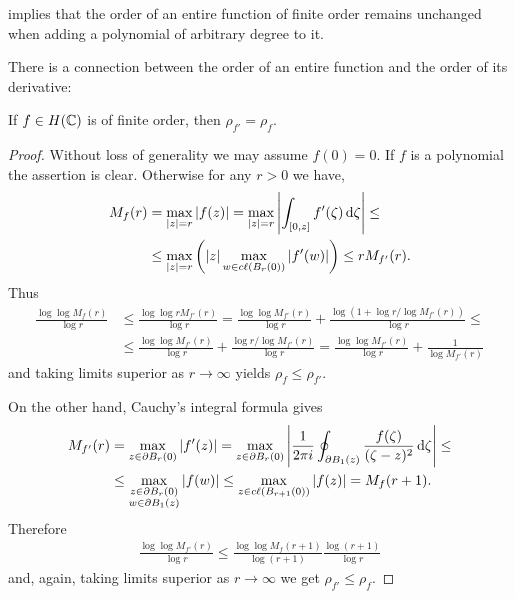  implies that the order of an entire function of finite order remains unchanged when adding a polynomial of arbitrary degree to it.

There is a connection between the order of an entire function and the order of its derivative:

\begin{proposition} \label{prop:order-derivative}
    If $f \in H(\mathbb{C})$ is of finite order, then $\rho_{f'} = \rho_f$.
\end{proposition}

\begin{proof}
    Without loss of generality we may assume $f(0) = 0$. If $f$ is a polynomial the assertion is clear. Otherwise for any $r > 0$ we have,
    \begin{align*}
        M_f(r) &= \max_{\vert z \vert = r} \vert f(z) \vert = \max_{\vert z \vert = r} \left\vert \int_{[0, z]} f'(\zeta) \mathop{}\!\mathrm{d} \zeta \right\vert \leq \\
        &\leq \max_{\vert z \vert = r} \left( \vert z \vert \max_{w \in c\ell({B_r(0)})} \vert f'(w) \vert \right) \leq r M_{f'}(r).
    \end{align*}
    Thus
    \begin{align*}
        \frac{\log \log M_f(r)}{\log r} &\leq \frac{\log \log r M_{f'}(r)}{\log r} = \frac{\log \log M_{f'}(r)}{\log r} + \frac{\log(1 + \log r / \log M_{f'}(r))}{\log r} \leq \\
        &\leq \frac{\log \log M_{f'}(r)}{\log r} + \frac{\log r / \log M_{f'}(r)}{\log r} = \frac{\log \log M_{f'}(r)}{\log r} + \frac{1}{\log M_{f'}(r)}
    \end{align*}
    and taking limits superior as $r \to \infty$ yields $\rho_f \leq \rho_{f'}$.

    On the other hand, Cauchy's integral formula gives
    \begin{align*}
        M_{f'}(r) &= \max_{z \in \partial B_r(0)} \vert f'(z) \vert = \max_{z \in \partial B_r(0)} \left\vert \frac{1}{2\pi i} \oint_{\partial B_1(z)} \frac{f(\zeta)}{(\zeta-z)^2} \mathop{}\!\mathrm{d} \zeta \right\vert \leq \\
        &\leq \max_{\substack{z \in \partial B_r(0) \\ w \in \partial B_1(z)}} \vert f(w) \vert \leq \max_{z \in c\ell({B_{r+1}(0)})} \vert f(z) \vert = M_f(r + 1).
    \end{align*}
    Therefore
    \begin{align*}
        \frac{\log \log M_{f'}(r)}{\log r} \leq \frac{\log \log M_f(r+1)}{\log (r+1)} \frac{\log (r+1)}{\log r}
    \end{align*}
    and, again, taking limits superior as $r \to \infty$ we get $\rho_{f'} \leq \rho_f$.
\end{proof}

